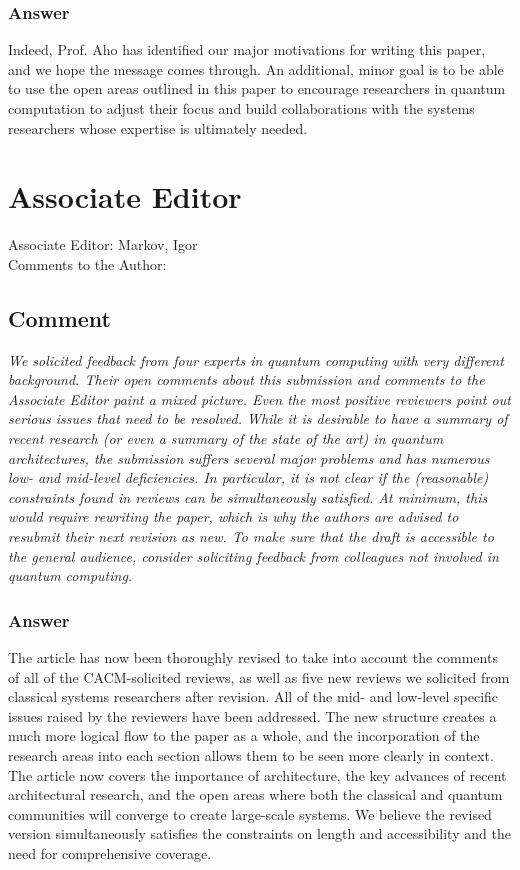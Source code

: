 \documentclass{article}
\newcommand{\comment}{\subsection{Comment}\em}
\newcommand{\answer}{\rm \subsubsection*{Answer}}
\begin{document}
\answer

Indeed, Prof. Aho has identified our major motivations for writing
this paper, and we hope the message comes through.  An additional,
minor goal is to be able to use the open areas outlined in this paper
to encourage researchers in quantum computation to adjust their focus
and build collaborations with the systems researchers whose expertise
is ultimately needed.

\section{Associate Editor}

Associate Editor: Markov, Igor\\
Comments to the Author:\\

\comment
We solicited feedback from four experts in quantum computing with very
different background. Their open comments about this submission and
comments to the Associate Editor paint a mixed picture. Even the most
positive reviewers point out serious issues that need to be
resolved. While it is desirable to have a summary of recent research
(or even a summary of the state of the art) in quantum architectures,
the submission suffers several major problems and has numerous low-
and mid-level deficiencies. In particular, it is not clear if the
(reasonable) constraints found in reviews can be simultaneously
satisfied. At minimum, this would require rewriting the paper, which
is why the authors are advised to resubmit their next revision as
new. To make sure that the draft is accessible to the general
audience, consider soliciting feedback from colleagues not involved in
quantum computing.

\answer

The article has now been thoroughly revised to take into account the
comments of all of the CACM-solicited reviews, as well as five new
reviews we solicited from classical systems researchers after
revision.  All of the mid- and low-level specific issues raised by the
reviewers have been addressed.  The new structure creates a much more
logical flow to the paper as a whole, and the incorporation of the
research areas into each section allows them to be seen more clearly
in context.  The article now covers the importance of architecture,
the key advances of recent architectural research, and the open areas
where both the classical and quantum communities will converge to
create large-scale systems.  We believe the revised version
simultaneously satisfies the constraints on length and accessibility
and the need for comprehensive coverage.
\end{document}
